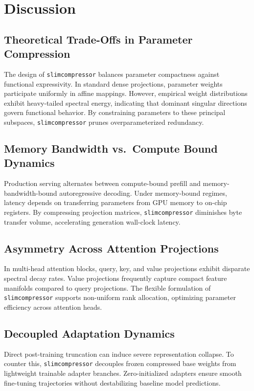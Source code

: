 \section{Discussion}

\subsection{Theoretical Trade-Offs in Parameter Compression}
The design of \texttt{slimcompressor} balances parameter compactness against functional expressivity. In standard dense projections, parameter weights participate uniformly in affine mappings. However, empirical weight distributions exhibit heavy-tailed spectral energy, indicating that dominant singular directions govern functional behavior. By constraining parameters to these principal subspaces, \texttt{slimcompressor} prunes overparameterized redundancy.

\subsection{Memory Bandwidth vs.\ Compute Bound Dynamics}
Production serving alternates between compute-bound prefill and memory-bandwidth-bound autoregressive decoding. Under memory-bound regimes, latency depends on transferring parameters from GPU memory to on-chip registers. By compressing projection matrices, \texttt{slimcompressor} diminishes byte transfer volume, accelerating generation wall-clock latency.

\subsection{Asymmetry Across Attention Projections}
In multi-head attention blocks, query, key, and value projections exhibit disparate spectral decay rates. Value projections frequently capture compact feature manifolds compared to query projections. The flexible formulation of \texttt{slimcompressor} supports non-uniform rank allocation, optimizing parameter efficiency across attention heads.

\subsection{Decoupled Adaptation Dynamics}
Direct post-training truncation can induce severe representation collapse. To counter this, \texttt{slimcompressor} decouples frozen compressed base weights from lightweight trainable adapter branches. Zero-initialized adapters ensure smooth fine-tuning trajectories without destabilizing baseline model predictions.

